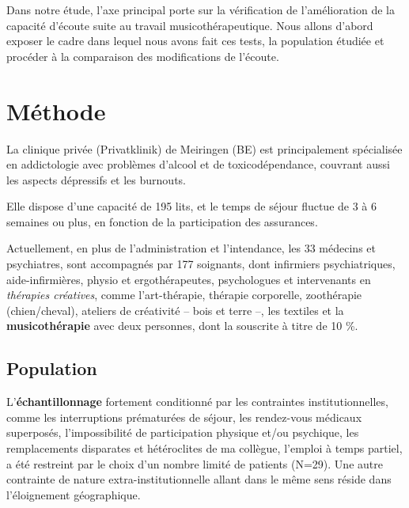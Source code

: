 
Dans notre étude, l'axe principal porte sur la
vérification de l'amélioration de
la capacité d'écoute suite au travail musicothérapeutique.
Nous allons
d'abord exposer le cadre dans lequel nous avons fait ces tests, la
population étudiée et procéder à la comparaison des modifications de
l'écoute.

\section{Méthode}

 La clinique privée (Privatklinik)
de Meiringen (BE) est  principalement spécialisée en
addictologie avec problèmes d'alcool et de toxicodépendance, couvrant aussi les aspects dépressifs
et les
burnouts.


Elle dispose d'une capacité de 195 lits, et le temps de séjour fluctue de 3 à 6 semaines ou plus, en
fonction de la participation des assurances.

Actuellement, en plus de l'administration et l'intendance, les 33
médecins et psychiatres, sont
accompagnés par 177
soignants, dont infirmiers psychiatriques, aide-infirmières, physio et
ergothérapeutes,
psychologues et intervenants en \textit{thérapies
créatives}, comme l'art-thérapie, thérapie
corporelle, zoothérapie (chien/cheval),  ateliers de créativité --
bois et terre --,  les textiles et la\textbf{ musicothérapie} avec deux
personnes, dont la souscrite à titre de 10 \%.








\subsection{Population}
L'\textbf{échantillonnage} fortement conditionné par les contraintes
institutionnelles, comme les interruptions prématurées de séjour, les rendez-vous
 médicaux superposés, l'impossibilité de participation physique et/ou
 psychique, les remplacements disparates et hétéroclites de ma
 collègue, l'emploi à
 temps partiel, a été restreint  par le choix d'un nombre limité de
 patients (N=29).
Une autre contrainte de nature extra-institutionnelle allant dans le
même sens réside dans l'éloignement géographique.

